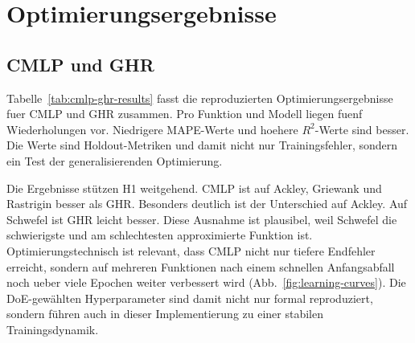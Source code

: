 \section{Optimierungsergebnisse}

\subsection{CMLP und GHR}

Tabelle~\ref{tab:cmlp-ghr-results} fasst die reproduzierten Optimierungsergebnisse fuer CMLP und GHR zusammen. Pro Funktion und Modell liegen fuenf Wiederholungen vor. Niedrigere MAPE-Werte und hoehere $R^2$-Werte sind besser. Die Werte sind Holdout-Metriken und damit nicht nur Trainingsfehler, sondern ein Test der generalisierenden Optimierung.

\begin{table}[H]
\centering
\footnotesize
\caption{Holdout-Resultate der Quaternion-Baselines. Werte sind Mittelwerte $\pm$ Standardabweichung ueber fuenf Wiederholungen.}
\label{tab:cmlp-ghr-results}
\end{table}

Die Ergebnisse stützen H1 weitgehend. CMLP ist auf Ackley, Griewank und Rastrigin besser als GHR. Besonders deutlich ist der Unterschied auf Ackley. Auf Schwefel ist GHR leicht besser. Diese Ausnahme ist plausibel, weil Schwefel die schwierigste und am schlechtesten approximierte Funktion ist. Optimierungstechnisch ist relevant, dass CMLP nicht nur tiefere Endfehler erreicht, sondern auf mehreren Funktionen nach einem schnellen Anfangsabfall noch ueber viele Epochen weiter verbessert wird (Abb.~\ref{fig:learning-curves}). Die DoE-gewählten Hyperparameter sind damit nicht nur formal reproduziert, sondern führen auch in dieser Implementierung zu einer stabilen Trainingsdynamik.

